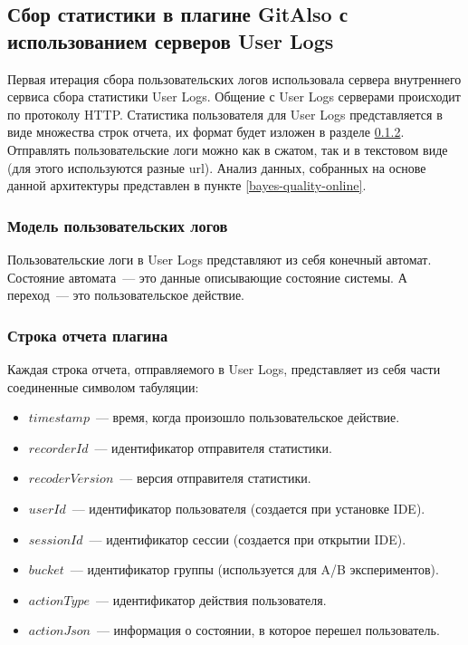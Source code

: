 \subsection{Сбор статистики в плагине GitAlso с использованием серверов User Logs}\label{gitalso-stats}
Первая итерация сбора пользовательских логов использовала сервера внутреннего сервиса сбора статистики User Logs. Общение с User Logs серверами происходит по протоколу HTTP. Статистика пользователя для User Logs представляется в виде множества строк отчета, их формат будет изложен в разделе \ref{report-line}. Отправлять пользовательские логи можно как в сжатом, так и в текстовом виде (для этого используются разные url). Анализ данных, собранных на основе данной архитектуры представлен в пункте \ref{bayes-quality-online}.
\subsubsection{Модель пользовательских логов}
Пользовательские логи в User Logs представляют из себя конечный автомат. Состояние автомата~--- это данные описывающие состояние системы. А переход~--- это пользовательское действие.
\subsubsection{Строка отчета плагина}\label{report-line}
Каждая строка отчета, отправляемого в User Logs, представляет из себя части соединенные символом табуляции:
    \begin{itemize}
        \item $timestamp$~--- время, когда произошло пользовательское действие.
        \item $recorderId$~--- идентификатор отправителя статистики.
        \item $recoderVersion$~--- версия отправителя статистики.
        \item $userId$~--- идентификатор пользователя (создается при установке IDE).
        \item $sessionId$~--- идентификатор сессии (создается при открытии IDE).
        \item $bucket$~--- идентификатор группы (используется для A/B экспериментов).
        \item $actionType$~--- идентификатор действия пользователя.
        \item $actionJson$~--- информация о состоянии, в которое перешел пользователь.
    \end{itemize}

